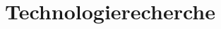 \documentclass[a4paper,10pt,fleqn]{article}
\title{Technologierecherche}
\begin{document}

\clearpage
\tableofcontents
\clearpage

\newcommand{\tabheader}     %
{
    \begin{zebratabular}[l]{@{}p{0.2\linewidth}p{0.3\linewidth}p{0.3\linewidth}p{0.06\linewidth}@{}}
    \rowcolor{gray}
    Stichwort &
        Quelle &
        Beschreibung &
        Bew. \\
}










\end{document}
